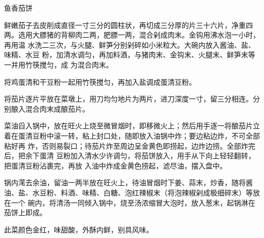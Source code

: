\begin{recipe}{鱼香茄饼}

\ingredients


\preparation

\step 鲜嫩茄子去皮削成直径一寸三分的圆柱状，再切成三分厚的片三十六片，净重四
两。选用大膘猪的背柳肉二两，肥膘一两，混合剁成肉末。金钩用沸水泡一小时，再用温
水洗二三次，与火腿、鲜笋分别剁碎如小米粒大。大碗内放入酱油、盐、味精、水豆
粉，加清水调匀，再加料酒，与猪肉末、金钩末、火腿末、鲜笋末等一并用竹筷搅匀，成
为混合肉末。

\step 将鸡蛋清和干豆粉一起用竹筷搅匀，再加入盐调成蛋清豆粉。

\step 将茄片逐片平放在菜墩上，用刀均匀地片为两片，进刀深度一寸，留三分相连。分
别酿入混合肉末成酿茄片。

\step 菜油舀入锅中，放在旺火上烧至微冒烟时，即移微火上；然后用手逐一将酿茄片立
着在蛋清豆粉中滚一转，粘上封口处，随即放入油锅中炸；要边粘边炸，不可全部粘好再
炸，否则易裂口；待茄片炸至周边呈金黄色即捞起，边炸边捞。全部炸完后，把余下蛋清
豆粉加入清水少许调匀，将茄饼放入，用手从下向上轻轻翻转，把蛋清豆粉沾裹完，再放
入油中炸成金黄色捞起，滤尽油，摆入盘中。

\step 锅内滗去余油，留油一两半放在旺火上，待油冒烟时下姜、蒜末，炒香，随将酱
油、盐、水豆粉、料酒、味精、白糖、泡红辣椒末（将泡辣椒剁成极细碎末）等放在一个
碗内，将清汤一同倾入锅中，烧至汤浓缩冒大泡时，放入葱末，起锅淋在茄饼上即成。

\features

此菜颜色金红，味甜酸，外酥内鲜，别具风味。

\end{recipe}


